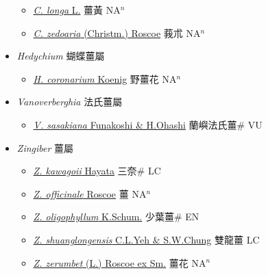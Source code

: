 \begin{itemize}
  \begin{itemize}
        \item[] \href{http://www.theplantlist.org/tpl1.1/search?q=Curcuma+longa}{\textit{C. longa} L.}   薑黃 NA$^n$
        \item[] \href{http://www.theplantlist.org/tpl1.1/search?q=Curcuma+zedoaria}{\textit{C. zedoaria} (Christm.) Roscoe}   莪朮 NA$^n$
  \end{itemize}
 \item[] \textit{Hedychium} 蝴蝶薑屬
                    
  \begin{itemize}
        \item[] \href{http://www.theplantlist.org/tpl1.1/search?q=Hedychium+coronarium}{\textit{H. coronarium} Koenig}   野薑花 NA$^n$
  \end{itemize}
 \item[] \textit{Vanoverberghia} 法氏薑屬
                    
  \begin{itemize}
        \item[] \href{http://www.theplantlist.org/tpl1.1/search?q=Vanoverberghia+sasakiana}{\textit{V. sasakiana} Funakoshi \& H.Ohashi}   蘭嶼法氏薑\# VU
  \end{itemize}
 \item[] \textit{Zingiber} 薑屬
                    
  \begin{itemize}
        \item[] \href{http://www.theplantlist.org/tpl1.1/search?q=Zingiber+kawagoii}{\textit{Z. kawagoii} Hayata}   三奈\# LC
        \item[] \href{http://www.theplantlist.org/tpl1.1/search?q=Zingiber+officinale}{\textit{Z. officinale} Roscoe}   薑 NA$^n$
        \item[] \href{http://www.theplantlist.org/tpl1.1/search?q=Zingiber+oligophyllum}{\textit{Z. oligophyllum} K.Schum.}   少葉薑\# EN
        \item[] \href{http://www.theplantlist.org/tpl1.1/search?q=Zingiber+shuanglongensis}{\textit{Z. shuanglongensis} C.L.Yeh \& S.W.Chung}   雙龍薑 LC
        \item[] \href{http://www.theplantlist.org/tpl1.1/search?q=Zingiber+zerumbet}{\textit{Z. zerumbet} (L.) Roscoe ex Sm.}   薑花 NA$^n$
  \end{itemize}
  \end{itemize}
